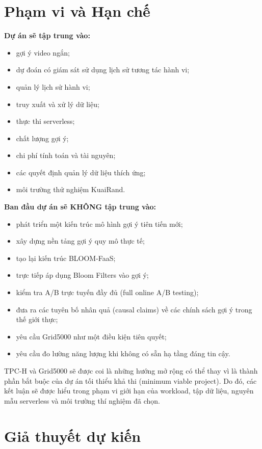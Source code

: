 \documentclass[12pt,a4paper]{article}
\begin{document}
\section{Phạm vi và Hạn chế}

\textbf{Dự án sẽ tập trung vào:}
\begin{itemize}
    \item gợi ý video ngắn;
    \item dự đoán có giám sát sử dụng lịch sử tương tác hành vi;
    \item quản lý lịch sử hành vi;
    \item truy xuất và xử lý dữ liệu;
    \item thực thi serverless;
    \item chất lượng gợi ý;
    \item chi phí tính toán và tài nguyên;
    \item các quyết định quản lý dữ liệu thích ứng;
    \item môi trường thử nghiệm KuaiRand.
\end{itemize}

\textbf{Ban đầu dự án sẽ KHÔNG tập trung vào:}
\begin{itemize}
    \item phát triển một kiến trúc mô hình gợi ý tiên tiến mới;
    \item xây dựng nền tảng gợi ý quy mô thực tế;
    \item tạo lại kiến trúc BLOOM-FaaS;
    \item trực tiếp áp dụng Bloom Filters vào gợi ý;
    \item kiểm tra A/B trực tuyến đầy đủ (full online A/B testing);
    \item đưa ra các tuyên bố nhân quả (causal claims) về các chính sách gợi ý trong thế giới thực;
    \item yêu cầu Grid5000 như một điều kiện tiên quyết;
    \item yêu cầu đo lường năng lượng khi không có sẵn hạ tầng đáng tin cậy.
\end{itemize}

TPC-H và Grid5000 sẽ được coi là những hướng mở rộng có thể thay vì là thành phần bắt buộc của dự án tối thiểu khả thi (minimum viable project). Do đó, các kết luận sẽ được hiểu trong phạm vi giới hạn của workload, tập dữ liệu, nguyên mẫu serverless và môi trường thí nghiệm đã chọn.

\section{Giả thuyết dự kiến}
\end{document}
